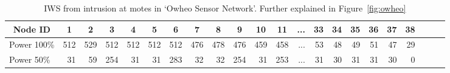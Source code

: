 \documentclass[conference]{IEEEtran}
\newcommand*{\bd}[1]{\multicolumn{1}{|c|}{\bfseries #1}}
\begin{document}
\begin{table}[t!]
\centering
\begin{tabular}{|l|*{20}{r|}r|}
\hline
\bd{Node ID}           & \bd{1} & \bd{2} & \bd{3} & \bd{4} & \bd{5} & \bd{6} & \bd{7} & \bd{8} & \bd{9} & \bd{10} & \bd{11} & \bd{...} & \bd{33} & \bd{34} & \bd{35} & \bd{36} & \bd{37} & \bd{38} \\
\hline		\hline

Power 100\%	   & 512 & 529 & 512 & 512 & 512  & 512 & 476 & 478 & 476 & 459 & 458 & ...& 53  & 48 & 49 & 51 & 47 & 29 \\
\hline

Power 50\%	  &31 & 59&254& 31& 31 &283& 32& 32& 254& 31 &253 & ... & 31  & 30 & 31 & 31 & 30 & 0 \\
\hline
\end{tabular}
\caption{IWS from intrusion at motes in `Owheo Sensor Network'. Further explained in Figure~\ref{fig:owheo}}
\label{tab:owheo}
\end{table}
\end{document}
